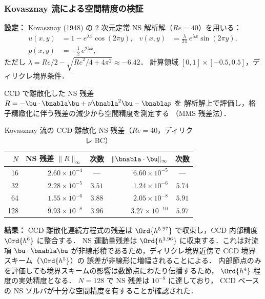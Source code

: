 \subsubsection{Kovasznay 流による空間精度の検証}
\label{sec:kovasznay}

\textbf{設定：}
Kovasznay (1948) の 2 次元定常 NS 解析解（$\mathit{Re} = 40$）を用いる：
\begin{align}
  u(x,y) &= 1 - e^{\lambda x}\cos(2\pi y), &
  v(x,y) &= \frac{\lambda}{2\pi}\,e^{\lambda x}\sin(2\pi y), \\
  p(x,y) &= -\tfrac{1}{2}\,e^{2\lambda x},
\end{align}
ただし $\lambda = \mathit{Re}/2 - \sqrt{\mathit{Re}^2/4 + 4\pi^2} \approx -6.42$．
計算領域 $[0, 1] \times [-0.5, 0.5]$，ディリクレ境界条件．

CCD で離散化した NS 残差 $R = -\bu \cdot\bnabla\bu + \nu\bnabla^2\bu - \bnabla p$ を
解析解上で評価し，格子精緻化に伴う残差の減少から空間精度を測定する
（MMS 残差法）．

\begin{table}[htbp]
\centering
\caption{Kovasznay 流の CCD 離散化 NS 残差（$\mathit{Re}=40$，ディリクレ BC）}
\label{tab:kovasznay}
\begin{tabular}{rrcrc}
\toprule
$N$ & NS 残差 $\|R\|_\infty$ & 次数 & $\|\bnabla\cdot\bu\|_\infty$ & 次数 \\
\midrule
 16 & $2.60 \times 10^{-4}$ & --- & $6.60 \times 10^{-5}$ & --- \\
 32 & $2.28 \times 10^{-5}$ & $3.51$ & $1.24 \times 10^{-6}$ & $5.74$ \\
 64 & $1.55 \times 10^{-6}$ & $3.88$ & $2.05 \times 10^{-8}$ & $5.91$ \\
128 & $9.93 \times 10^{-8}$ & $3.96$ & $3.27 \times 10^{-10}$ & $5.97$ \\
\bottomrule
\end{tabular}
\end{table}

\textbf{結果：}
CCD 離散化連続方程式の残差は $\Ord{h^{5.97}}$ で収束し，CCD 内部精度 $\Ord{h^6}$ に整合する．
NS 運動量残差は $\Ord{h^{3.96}}$ に収束する．これは対流項 $\bu \cdot \bnabla\bu$
が非線形積であるため，ディリクレ境界近傍で CCD 境界スキーム（$\Ord{h^5}$）の
誤差が非線形に増幅されることによる．
内部節点のみを評価しても境界スキームの影響は数節点にわたり伝播するため，
$\Ord{h^4}$ 程度の実効精度となる．
$N=128$ で NS 残差は $10^{-8}$ に達しており，
CCD ベースの NS ソルバが十分な空間精度を有することが確認された．
